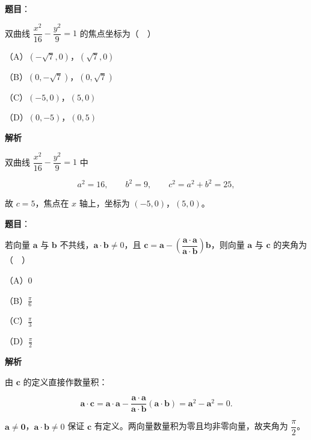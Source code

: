 \begin{answer}

\textbf{题目}：

双曲线 $\dfrac{x^2}{16}-\dfrac{y^2}{9}=1$ 的焦点坐标为（　）

（A）$(-\sqrt7,0)$，$(\sqrt7,0)$

（B）$(0,-\sqrt7)$，$(0,\sqrt7)$

（C）$(-5,0)$，$(5,0)$

（D）$(0,-5)$，$(0,5)$

\textbf{解析}

双曲线 $\dfrac{x^2}{16}-\dfrac{y^2}{9}=1$ 中

\nopagebreak[4]
\[a^2=16,\qquad b^2=9,\qquad c^2=a^2+b^2=25,\]

故 $c=5$，焦点在 $x$ 轴上，坐标为 $(-5,0)$，$(5,0)$。


\end{answer}
\begin{answer}

\textbf{题目}：

若向量 $\boldsymbol a$ 与 $\boldsymbol b$ 不共线，$\boldsymbol a\cdot\boldsymbol b\neq0$，且 $\boldsymbol c=\boldsymbol a-\left(\dfrac{\boldsymbol a\cdot\boldsymbol a}{\boldsymbol a\cdot\boldsymbol b}\right)\boldsymbol b$，则向量 $\boldsymbol a$ 与 $\boldsymbol c$ 的夹角为（　）

（A）$0$

（B）$\frac{\pi}{6}$

（C）$\frac{\pi}{3}$

（D）$\frac{\pi}{2}$

\textbf{解析}

由 $\boldsymbol c$ 的定义直接作数量积：

\nopagebreak[4]
\[\boldsymbol a\cdot\boldsymbol c=\boldsymbol a\cdot\boldsymbol a-\frac{\boldsymbol a\cdot\boldsymbol a}{\boldsymbol a\cdot\boldsymbol b}(\boldsymbol a\cdot\boldsymbol b)=\boldsymbol a^2-\boldsymbol a^2=0.\]

$\boldsymbol a\neq\boldsymbol 0$，$\boldsymbol a\cdot\boldsymbol b\neq0$ 保证 $\boldsymbol c$ 有定义。两向量数量积为零且均非零向量，故夹角为 $\dfrac{\pi}{2}$。


\end{answer}
